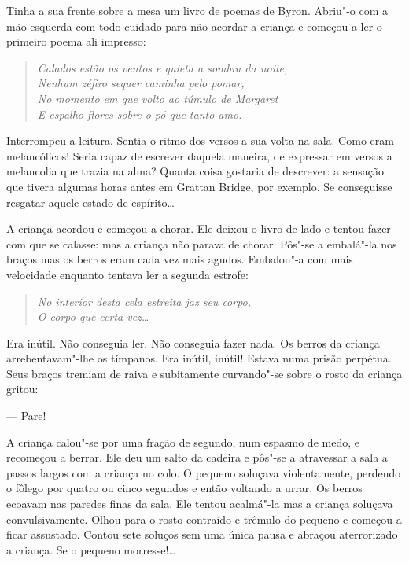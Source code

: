 Tinha a sua frente sobre a mesa um livro de poemas de Byron.  Abriu"-o com a mão
esquerda com todo cuidado para não acordar a criança e começou a ler o primeiro
poema ali impresso:

\begin{verse}\itshape
Calados estão os ventos e quieta a sombra da noite,\\
Nenhum zéfiro sequer caminha pelo pomar,\\
No momento em que volto ao túmulo de Margaret\\
E espalho flores sobre o pó que tanto amo.
\end{verse}

Interrompeu a leitura.  Sentia o ritmo dos versos a sua volta na sala.  Como
eram melancólicos!  Seria capaz de escrever daquela maneira, de expressar em
versos a melancolia que trazia na alma?  Quanta coisa gostaria de descrever: a
sensação que tivera algumas horas antes em Grattan Bridge, por exemplo.  Se
conseguisse resgatar aquele estado de espírito\ldots{}

A criança acordou e começou a chorar.  Ele deixou o livro de lado e tentou
fazer com que se calasse: mas a criança não parava de chorar.  Pôs"-se a
embalá"-la nos braços mas os berros eram cada vez mais agudos.  Embalou"-a com
mais velocidade enquanto tentava ler a segunda estrofe:

\begin{verse}\itshape
No interior desta cela estreita jaz seu corpo,\\
O corpo que certa vez\ldots{}
\end{verse}

Era inútil.  Não conseguia ler.  Não conseguia fazer nada.  Os berros da
criança arrebentavam"-lhe os tímpanos.  Era inútil, inútil!  Estava numa prisão
perpétua.  Seus braços tremiam de raiva e subitamente curvando"-se sobre o rosto
da criança gritou:

--- Pare!

A criança calou"-se por uma fração de segundo, num espasmo de medo, e recomeçou
a berrar.  Ele deu um salto da cadeira e pôs"-se a atravessar a sala a passos
largos com a criança no colo.  O pequeno soluçava violentamente, perdendo o
fôlego por quatro ou cinco segundos e então voltando a urrar.  Os berros
ecoavam nas paredes finas da sala.  Ele tentou acalmá"-la mas a criança soluçava
convulsivamente.  Olhou para o rosto contraído e trêmulo do pequeno e começou a
ficar assustado.  Contou sete soluços sem uma única pausa e abraçou
aterrorizado a criança.  Se o pequeno morresse!\ldots{}

